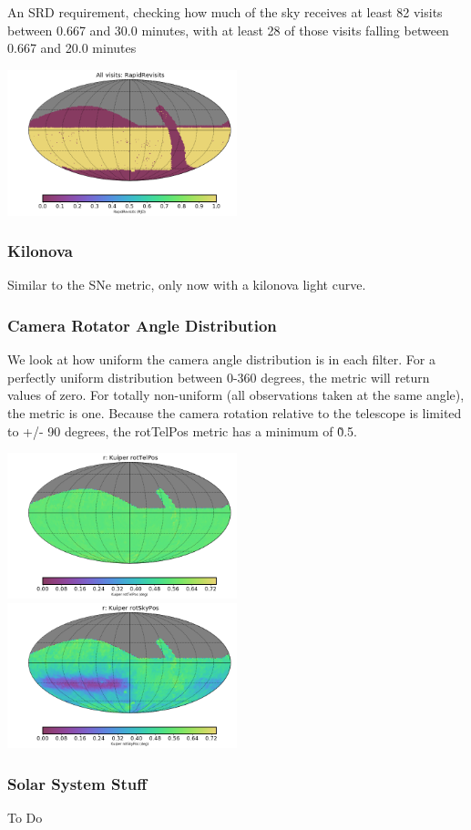 An SRD requirement, checking how much of the sky receives at least 82 visits between 0.667 and 30.0 minutes, with at least 28 of those visits falling between 0.667 and 20.0 minutes

\includegraphics[width=0.5\textwidth]{metric_summary/sci_baseline_v1.4_10yrs/thumb._RapidRevisits_All_visits_HEAL_SkyMap.png}

\subsubsection{Kilonova}

Similar to the SNe metric, only now with a kilonova light curve.

\subsubsection{Camera Rotator Angle Distribution}

We look at how uniform the camera angle distribution is in each filter. For a perfectly uniform distribution between 0-360 degrees, the metric will return values of zero. For totally non-uniform (all observations taken at the same angle), the metric is one.  Because the camera rotation relative to the telescope is limited to +/- 90 degrees, the rotTelPos metric has a minimum of \~0.5. 

\includegraphics[width=0.5\textwidth]{metric_summary/sci_baseline_v1.4_10yrs/thumb._Kuiper_rotTelPos_r_HEAL_SkyMap.png}
\includegraphics[width=0.5\textwidth]{metric_summary/sci_baseline_v1.4_10yrs/thumb._Kuiper_rotSkyPos_r_HEAL_SkyMap.png}


\subsubsection{Solar System Stuff}

To Do





